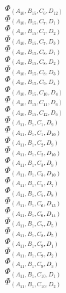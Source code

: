 \documentclass[14pt]{article}
\begin{document}
    $\Phi_{({A}_{10}, {B}_{15}, {C}_{6}, {D}_{12})}$ \\ 
    $\Phi_{({A}_{10}, {B}_{15}, {C}_{7}, {D}_{1})}$ \\ 
    $\Phi_{({A}_{10}, {B}_{15}, {C}_{7}, {D}_{2})}$ \\ 
    $\Phi_{({A}_{10}, {B}_{15}, {C}_{7}, {D}_{3})}$ \\ 
    $\Phi_{({A}_{10}, {B}_{15}, {C}_{8}, {D}_{1})}$ \\ 
    $\Phi_{({A}_{10}, {B}_{15}, {C}_{8}, {D}_{2})}$ \\ 
    $\Phi_{({A}_{10}, {B}_{15}, {C}_{8}, {D}_{3})}$ \\ 
    $\Phi_{({A}_{10}, {B}_{15}, {C}_{9}, {D}_{4})}$ \\ 
    $\Phi_{({A}_{10}, {B}_{15}, {C}_{10}, {D}_{4})}$ \\ 
    $\Phi_{({A}_{10}, {B}_{15}, {C}_{11}, {D}_{6})}$ \\ 
    $\Phi_{({A}_{10}, {B}_{15}, {C}_{12}, {D}_{6})}$ \\ 
    $\Phi_{({A}_{11}, {B}_{1}, {C}_{1}, {D}_{9})}$ \\ 
    $\Phi_{({A}_{11}, {B}_{1}, {C}_{1}, {D}_{10})}$ \\ 
    $\Phi_{({A}_{11}, {B}_{1}, {C}_{2}, {D}_{9})}$ \\ 
    $\Phi_{({A}_{11}, {B}_{1}, {C}_{2}, {D}_{10})}$ \\ 
    $\Phi_{({A}_{11}, {B}_{1}, {C}_{3}, {D}_{9})}$ \\ 
    $\Phi_{({A}_{11}, {B}_{1}, {C}_{3}, {D}_{10})}$ \\ 
    $\Phi_{({A}_{11}, {B}_{1}, {C}_{5}, {D}_{7})}$ \\ 
    $\Phi_{({A}_{11}, {B}_{1}, {C}_{5}, {D}_{8})}$ \\ 
    $\Phi_{({A}_{11}, {B}_{1}, {C}_{6}, {D}_{13})}$ \\ 
    $\Phi_{({A}_{11}, {B}_{1}, {C}_{6}, {D}_{14})}$ \\ 
    $\Phi_{({A}_{11}, {B}_{1}, {C}_{7}, {D}_{5})}$ \\ 
    $\Phi_{({A}_{11}, {B}_{1}, {C}_{8}, {D}_{5})}$ \\ 
    $\Phi_{({A}_{11}, {B}_{1}, {C}_{9}, {D}_{1})}$ \\ 
    $\Phi_{({A}_{11}, {B}_{1}, {C}_{9}, {D}_{2})}$ \\ 
    $\Phi_{({A}_{11}, {B}_{1}, {C}_{9}, {D}_{3})}$ \\ 
    $\Phi_{({A}_{11}, {B}_{1}, {C}_{10}, {D}_{1})}$ \\ 
    $\Phi_{({A}_{11}, {B}_{1}, {C}_{10}, {D}_{2})}$ \\ 
\end{document}
